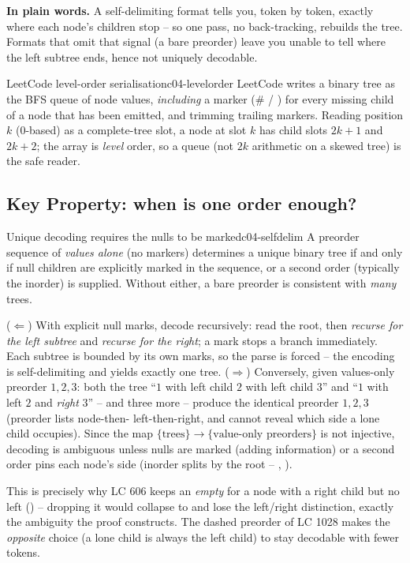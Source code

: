 \noindent\textbf{In plain words.} A self-delimiting format tells you, token by token, exactly
where each node's children stop -- so one pass, no back-tracking, rebuilds the
tree. Formats that omit that signal (a bare preorder) leave you unable to tell where the left
subtree ends, hence not uniquely decodable.

\begin{definition}{LeetCode level-order serialisation}{c04-levelorder}
LeetCode writes a binary tree as the BFS queue of node values, \emph{including} a marker (\# /
) for every missing child of a node that has been emitted, and trimming trailing
markers. Reading position $k$ (0-based) as a complete-tree slot, a node at slot $k$ has child
slots $2k+1$ and $2k+2$; the array is \emph{level} order, so a queue (not $2k$ arithmetic on a
skewed tree) is the safe reader.
\end{definition}

\subsection{Key Property: when is one order enough?}

\begin{theorem}{Unique decoding requires the nulls to be marked}{c04-selfdelim}
A preorder sequence of \emph{values alone} (no markers) determines a unique binary tree if and
only if null children are explicitly marked in the sequence, or a second order (typically the
inorder) is supplied. Without either, a bare preorder is consistent with \emph{many} trees.
\end{theorem}
\begin{proofbox}
($\Leftarrow$) With explicit null marks, decode recursively: read the root, then \emph{recurse
for the left subtree} and \emph{recurse for the right}; a mark stops a branch immediately. Each
subtree is bounded by its own marks, so the parse is forced -- the encoding is self-delimiting
and yields exactly one tree. ($\Rightarrow$) Conversely, given values-only preorder $1,2,3$: both
the tree ``$1$ with left child $2$ with left child $3$'' and ``$1$ with left $2$ and \emph{right}
$3$'' -- and three more -- produce the identical preorder $1,2,3$ (preorder lists node-then-
left-then-right, and cannot reveal which side a lone child occupies). Since the map
$\{\text{trees}\} \to \{\text{value-only preorders}\}$ is not injective, decoding is ambiguous
unless nulls are marked (adding information) or a second order pins each node's
side (inorder splits by the root -- , ).
\end{proofbox}
\begin{insightbox}
This is precisely why LC 606 keeps an \emph{empty} \code{()} for a node with a right child but
no left () -- dropping it would collapse  to 
and lose the left/right distinction, exactly the ambiguity the proof constructs. The dashed
preorder of LC 1028 makes the \emph{opposite} choice (a lone child is always the left child) to
stay decodable with fewer tokens.
\end{insightbox}

